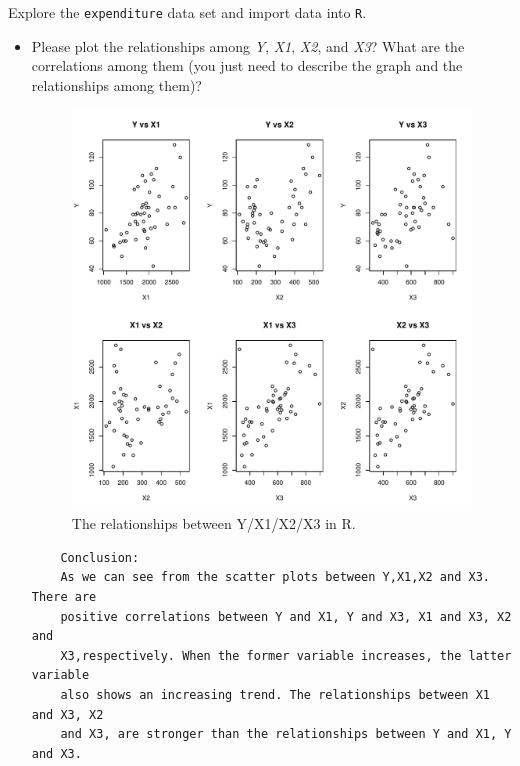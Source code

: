 \documentclass[12pt,letterpaper]{article}
\begin{document}
\vspace{.5cm}
\noindent Explore the \texttt{expenditure} data set and import data into \texttt{R}.
\vspace{.5cm}
\vspace{.5cm}
\begin{itemize}

\item
Please plot the relationships among \emph{Y}, \emph{X1}, \emph{X2}, and \emph{X3}? What are the correlations among them (you just need to describe the graph and the relationships among them)?
\vspace{.5cm}
  

\begin{figure}[h!]\centering
		\caption{\footnotesize The relationships between Y/X1/X2/X3 in R.}
		\label{fig:plot_1}
		\includegraphics[width=.85\textwidth]{Problem2_Question1_ScatterPlots.pdf}
	\end{figure}

\begin{verbatim}
	Conclusion:
	As we can see from the scatter plots between Y,X1,X2 and X3. There are 
	positive correlations between Y and X1, Y and X3, X1 and X3, X2 and 
	X3,respectively. When the former variable increases, the latter variable 
	also shows an increasing trend. The relationships between X1 and X3, X2 
	and X3, are stronger than the relationships between Y and X1, Y and X3.    
	

\end{verbatim}
\end{itemize}
\end{document}
